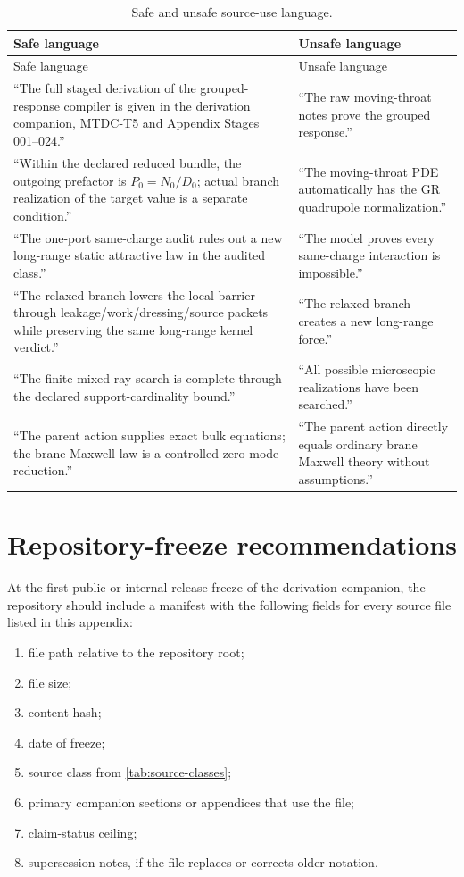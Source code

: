 \begin{longtable}{@{}L{0.44\textwidth}L{0.45\textwidth}@{}}
\caption{Safe and unsafe source-use language.}\label{tab:safe-source-use-language}\\
\toprule
Safe language & Unsafe language \\
\midrule
\endfirsthead
\toprule
Safe language & Unsafe language \\
\midrule
\endhead
``The full staged derivation of the grouped-response compiler is given in the derivation companion, MTDC-T5 and Appendix Stages 001--024.'' & ``The raw moving-throat notes prove the grouped response.'' \\
\addlinespace
``Within the declared reduced bundle, the outgoing prefactor is \(P_0=N_0/D_0\); actual branch realization of the target value is a separate condition.'' & ``The moving-throat PDE automatically has the GR quadrupole normalization.'' \\
\addlinespace
``The one-port same-charge audit rules out a new long-range static attractive law in the audited class.'' & ``The model proves every same-charge interaction is impossible.'' \\
\addlinespace
``The relaxed branch lowers the local barrier through leakage/work/dressing/source packets while preserving the same long-range kernel verdict.'' & ``The relaxed branch creates a new long-range force.'' \\
\addlinespace
``The finite mixed-ray search is complete through the declared support-cardinality bound.'' & ``All possible microscopic realizations have been searched.'' \\
\addlinespace
``The parent action supplies exact bulk equations; the brane Maxwell law is a controlled zero-mode reduction.'' & ``The parent action directly equals ordinary brane Maxwell theory without assumptions.'' \\
\bottomrule
\end{longtable}

\section{Repository-freeze recommendations}
\label{sec:repository-freeze-recommendations}

At the first public or internal release freeze of the derivation companion, the repository should include a manifest with the following fields for every source file listed in this appendix:

\begin{enumerate}[leftmargin=2.4em]
\item file path relative to the repository root;
\item file size;
\item content hash;
\item date of freeze;
\item source class from \cref{tab:source-classes};
\item primary companion sections or appendices that use the file;
\item claim-status ceiling;
\item supersession notes, if the file replaces or corrects older notation.
\end{enumerate}

